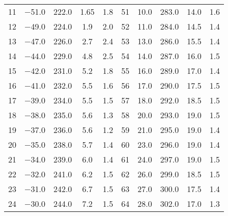 \begin{table}
\begin{tabular}{S S S S S | S S S S S}
      \num{11} &  \num{-51.0} &  \num{222.0} &  \num{ 1.65} &  \num{1.8} & \num{51} &  \num{ 10.0} &  \num{283.0} &  \num{14.0 } &  \num{1.6} \\ 
      \num{12} &  \num{-49.0} &  \num{224.0} &  \num{ 1.9 } &  \num{2.0} & \num{52} &  \num{ 11.0} &  \num{284.0} &  \num{14.5 } &  \num{1.4} \\ 
      \num{13} &  \num{-47.0} &  \num{226.0} &  \num{ 2.7 } &  \num{2.4} & \num{53} &  \num{ 13.0} &  \num{286.0} &  \num{15.5 } &  \num{1.4} \\ 
      \num{14} &  \num{-44.0} &  \num{229.0} &  \num{ 4.8 } &  \num{2.5} & \num{54} &  \num{ 14.0} &  \num{287.0} &  \num{16.0 } &  \num{1.5} \\ 
      \num{15} &  \num{-42.0} &  \num{231.0} &  \num{ 5.2 } &  \num{1.8} & \num{55} &  \num{ 16.0} &  \num{289.0} &  \num{17.0 } &  \num{1.4} \\ 
      \num{16} &  \num{-41.0} &  \num{232.0} &  \num{ 5.5 } &  \num{1.6} & \num{56} &  \num{ 17.0} &  \num{290.0} &  \num{17.5 } &  \num{1.5} \\ 
      \num{17} &  \num{-39.0} &  \num{234.0} &  \num{ 5.5 } &  \num{1.5} & \num{57} &  \num{ 18.0} &  \num{292.0} &  \num{18.5 } &  \num{1.5} \\ 
      \num{18} &  \num{-38.0} &  \num{235.0} &  \num{ 5.6 } &  \num{1.3} & \num{58} &  \num{ 20.0} &  \num{293.0} &  \num{19.0 } &  \num{1.5} \\ 
      \num{19} &  \num{-37.0} &  \num{236.0} &  \num{ 5.6 } &  \num{1.2} & \num{59} &  \num{ 21.0} &  \num{295.0} &  \num{19.0 } &  \num{1.4} \\ 
      \num{20} &  \num{-35.0} &  \num{238.0} &  \num{ 5.7 } &  \num{1.4} & \num{60} &  \num{ 23.0} &  \num{296.0} &  \num{19.0 } &  \num{1.4} \\ 
      \num{21} &  \num{-34.0} &  \num{239.0} &  \num{ 6.0 } &  \num{1.4} & \num{61} &  \num{ 24.0} &  \num{297.0} &  \num{19.0 } &  \num{1.5} \\ 
      \num{22} &  \num{-32.0} &  \num{241.0} &  \num{ 6.2 } &  \num{1.5} & \num{62} &  \num{ 26.0} &  \num{299.0} &  \num{18.5 } &  \num{1.5} \\ 
      \num{23} &  \num{-31.0} &  \num{242.0} &  \num{ 6.7 } &  \num{1.5} & \num{63} &  \num{ 27.0} &  \num{300.0} &  \num{17.5 } &  \num{1.4} \\ 
      \num{24} &  \num{-30.0} &  \num{244.0} &  \num{ 7.2 } &  \num{1.5} & \num{64} &  \num{ 28.0} &  \num{302.0} &  \num{17.0 } &  \num{1.3} \\ 

\end{tabular}
\end{table}
